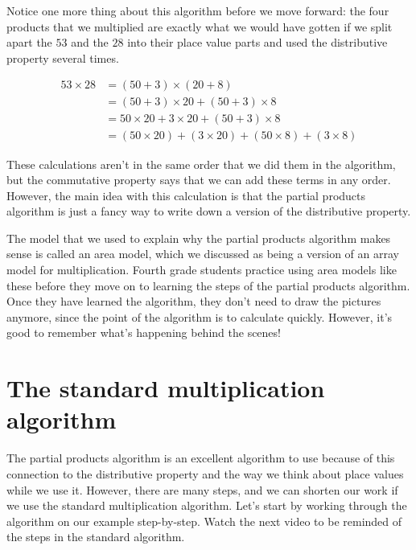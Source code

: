 \documentclass{ximera}
\begin{document}
Notice one more thing about this algorithm before we move forward: the four products that we multiplied are exactly what we would have gotten if we split apart the $53$ and the $28$ into their place value parts and used the distributive property several times.

\begin{align*}
53 \times 28 &= (50 + 3) \times (20 + 8) \\
& = (50+3) \times 20 + (50 + 3) \times 8 \\
&= 50 \times 20 + 3 \times 20 + (50+3) \times 8 \\
&= (50 \times 20) + (3 \times 20) + (50 \times 8) + (3 \times 8)
\end{align*}

These calculations aren't in the same order that we did them in the algorithm, but the commutative property says that we can add these terms in any order. However, the main idea with this calculation is that the partial products algorithm is just a fancy way to write down a version of the distributive property. 

The model that we used to explain why the partial products algorithm makes sense is called an area model, which we discussed as being a version of an array model for multiplication. Fourth grade students practice using area models like these before they move on to learning the steps of the partial products algorithm. Once they have learned the algorithm, they don't need to draw the pictures anymore, since the point of the algorithm is to calculate quickly. However, it's good to remember what's happening behind the scenes!


\section{The standard multiplication algorithm}

The partial products algorithm is an excellent algorithm to use because of this connection to the distributive property and the way we think about place values while we use it. However, there are many steps, and we can shorten our work if we use the standard multiplication algorithm. Let's start by working through the algorithm on our example step-by-step. Watch the next video to be reminded of the steps in the standard algorithm. 

\end{document}
